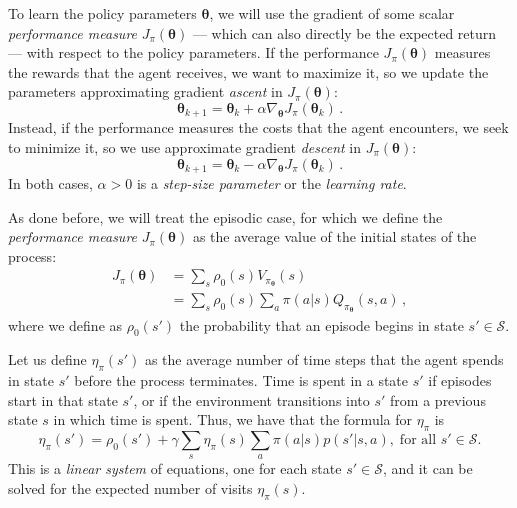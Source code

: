 To learn the policy parameters $\boldsymbol \theta$, we will use the gradient of some scalar \emph{performance measure} $J_\pi(\boldsymbol \theta)$ --- which can also directly be the expected return --- with respect to the policy parameters. If the performance $J_\pi(\boldsymbol \theta)$ measures the rewards that the agent receives, we want to maximize it, so we update the parameters approximating gradient \textit{ascent} in $J_\pi(\boldsymbol \theta)$:
\begin{equation}
    \boldsymbol \theta_{k+1} = \boldsymbol \theta_k + \alpha \nabla_{\boldsymbol \theta} J_\pi(\boldsymbol \theta_k) \, .
    \label{eq:grad-ascent}
\end{equation}
Instead, if the performance measures the costs that the agent encounters, we seek to minimize it, so we use approximate gradient \textit{descent} in $J_\pi(\boldsymbol \theta)$:
\begin{equation}
    \boldsymbol \theta_{k+1} = \boldsymbol \theta_k - \alpha \nabla_{\boldsymbol \theta} J_\pi(\boldsymbol \theta_k) \, .
    \label{eq:grad-descent}
\end{equation}
In both cases, $\alpha > 0$ is a \emph{step-size parameter} or the \emph{learning rate}.

As done before, we will treat the episodic case, for which we define the \emph{performance measure} $J_\pi(\boldsymbol \theta)$ as the average value of the initial states of the process:
\begin{equation}
    \begin{aligned}
        J_\pi (\boldsymbol \theta) 
        &= \sum_s \rho_0(s) V_{\pi_{\boldsymbol \theta}}(s) \\
        &= \sum_s \rho_0(s) \sum_a \pi(a|s) Q_{\pi_{\boldsymbol \theta}}(s, a) \, ,
    \end{aligned}
    \label{eq:J}
\end{equation}
where we define as $\rho_0(s')$ the probability that an episode begins in state $s' \in \mathcal S$.

Let us define $\eta_\pi(s')$ as the average number of time steps that the agent spends in state $s'$ before the process terminates. Time is spent in a state $s'$ if episodes start in that state $s'$, or if the environment transitions into $s'$ from a previous state $s$ in which time is spent. Thus, we have that the formula for $\eta_\pi$ is
\begin{equation}
    \eta_\pi(s') = \rho_0(s') + \gamma \sum_s \eta_\pi(s) \sum_a \pi(a|s) p(s'|s, a), \; \text{for all } s' \in \mathcal S.
    \label{eq:eta}
\end{equation}
This is a \textit{linear system} of equations, one for each state $s' \in \mathcal S$, and it can be solved for the expected number of visits $\eta_\pi(s)$.


